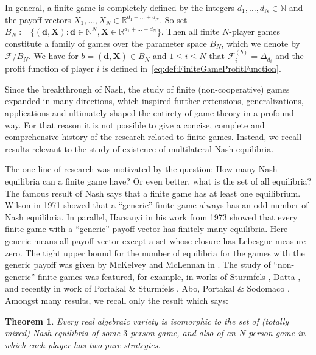 \documentclass[a4paper,11pt,reqno,english]{amsart}
\theoremstyle{plain}
\newtheorem*{theorem*}{Theorem}
\theoremstyle{definition}
\begin{document}
\medskip
In general, a finite game is completely defined by the integers $d_1,\dots,d_N\in\mathbb{N}$ and the payoff vectors $X_1,\dots,X_N\in\mathbb{R}^{d_1+\dots+ d_N}$. So set $B_N:= \{(\mathbf{d}, \mathbf{X})\colon \mathbf{d}\in\mathbb{N}^N, \mathbf{X}\in\mathbb{R}^{d_1+\dots+d_N}\}$.
Then all finite $N$-player games constitute a family of games over the parameter space $B_N$, which we denote by $\mathcal{F}/B_N$. We have for $b=(\mathbf{d},\mathbf{X})\in B_N$ and $1\leq i\leq N$ that $\mathcal{F}^{(b)}_i = \Delta_{d_i}$ and the profit function of player $i$ is defined in~\eqref{eq:def:FiniteGameProfitFunction}.

\medskip
Since the breakthrough of Nash, the study of finite (non-cooperative) games expanded in many directions, which inspired further extensions, generalizations, applications and ultimately shaped the entirety of game theory in a profound way.
For that reason it is not possible to give a concise, complete and comprehensive history of the research related to finite games.
Instead, we recall results relevant to the study of existence of multilateral Nash equilibria.

\medskip
The one line of research was motivated by the question: How many Nash equilibria can a finite game have? Or even better, what is the set of all equilibria?
The famous result of Nash \cite{Nash1951} says that a finite game has at least one equilibrium.
Wilson \cite[Thm.\,1]{Wilson1971} in 1971 showed that a ``generic'' finite game always has an odd number of Nash equilibria.
In parallel, Harsanyi in his work \cite{Harsanyi1973} from 1973 showed that every finite game with a ``generic'' payoff vector has finitely many equilibria.
Here generic means all payoff vector except a set whose closure has Lebesgue measure zero.
The tight upper bound for the number of equilibria for the games with the generic payoff was given by McKelvey and McLennan in \cite{McKelveyMcLennan1997}.
The study of ``non-generic'' finite games was featured, for example, in works of Sturmfels \cite{Sturmfels2002}, Datta \cite{Datta2003a,Datta2003b,Datta2010}, and recently in work of Portakal \& Sturmfels \cite{PortakalSturmfels2022}, Abo, Portakal \& Sodomaco \cite{AboPortakalSodomaco2025}.
Amongst many results, we recall only the result \cite[Thm.\,1]{Datta2003b} which says:
\begin{theorem*}
	Every real algebraic variety is isomorphic to the set of (totally mixed) Nash equilibria of some $3$-person game, and also of an $N$-person game in which each player has two pure strategies.
\end{theorem*}
\end{document}
